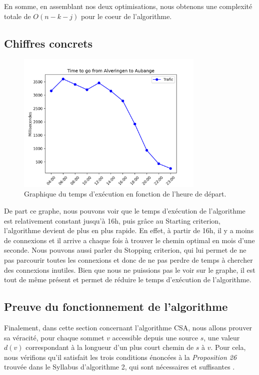 \documentclass[12pt]{article}
\begin{document}
En somme, en assemblant nos deux optimisations, nous obtenons une complexité totale de $O(n - k - j)$ pour le coeur de l'algorithme.

\subsection{Chiffres concrets}
\begin{figure}[H]
  \centering
  \includegraphics[width=0.8\textwidth]{graphique_traffique}
  \caption{Graphique du temps d'exécution en fonction de l'heure de départ.}
  \label{fig:graphique_traffique}
\end{figure}
De part ce graphe, nous pouvons voir que le temps d'exécution de l'algorithme est relativement constant jusqu'à 16h, puis grâce au Starting criterion,
l'algorithme devient de plus en plus rapide. En effet, à partir de 16h, il y a moins de connexions et il arrive a chaque fois à trouver le chemin optimal en mois d'une seconde.
Nous pouvons aussi parler du Stopping criterion, qui lui permet de ne pas parcourir toutes les connexions et donc de ne pas perdre de temps à chercher des connexions inutiles.
Bien que nous ne puissions pas le voir sur le graphe, il est tout de même présent et permet de réduire le temps d'exécution de l'algorithme.

\subsection{Preuve du fonctionnement de l'algorithme}

Finalement, dans cette section concernant l'algorithme CSA, nous allons prouver sa véracité, pour chaque sommet $v$ accessible depuis une source $s$, une 
valeur $d(v)$ correspondant à la longueur d'un plus court chemin de $s$ à $v$. Pour cela, nous vérifions qu'il satisfait les trois conditions énoncées 
à la \emph{Proposition 26} trouvée dans le Syllabus d'algorithme 2, qui sont nécessaires et suffisantes \cite{syllabusAlgo2}.
\end{document}
